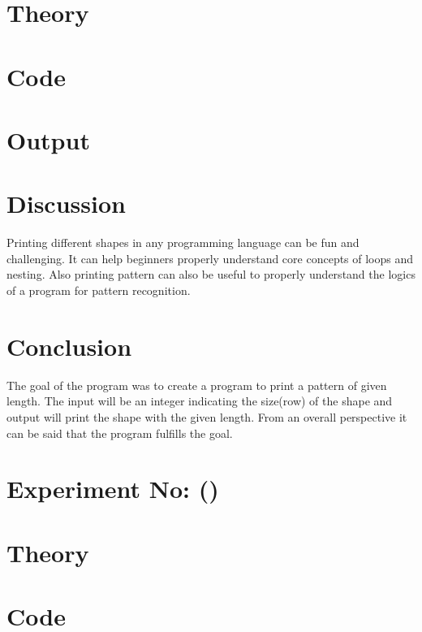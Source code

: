 \documentclass{report}
\newcounter{exp_no}
\begin{document}
\section*{Theory}


\section*{Code}


\section*{Output}
\begin{tcolorbox}[colback=black, coltext=white, fontupper=\ttfamily\small,sharp corners ]
    
\end{tcolorbox}

\section*{Discussion}
Printing different shapes in any programming language can be fun and challenging. It can help beginners properly understand core concepts of loops and nesting. Also printing pattern can also be useful to properly understand the logics of a program for pattern recognition.

\section*{Conclusion}
The goal of the program was to create a program to print a pattern of given length. The input will be an integer indicating the size(row) of the shape and output will print the shape with the given length. From an  overall perspective it can be said that the program fulfills the goal.

\section*{Experiment No:  \thechapter ()}

\section*{Theory}


\section*{Code}

\end{document}
